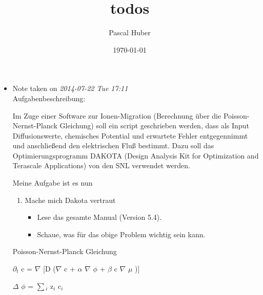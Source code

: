 \documentclass[11pt]{article}
\title{todos}
\author{Pascal Huber}
\date{\today}
\begin{document}
\maketitle

\setcounter{tocdepth}{3}
\tableofcontents
\vspace*{1cm}
\begin{itemize}
\item Note taken on \textit{2014-07-22 Tue 17:11} \\
Aufgabenbeschreibung:

     Im Zuge einer Software zur Ionen-Migration (Berechnung über die Poisson-Nernst-Planck Gleichung) soll ein script geschrieben werden, dass als Input Diffusionswerte, chemisches Potential und erwartete Fehler entgegennimmt und anschließend den elektrischen Fluß bestimmt.
     Dazu soll das Optimierungsprogramm DAKOTA (Design Analysis Kit for Optimization and Terascale Applications) von den SNL verwendet werden.

     Meine Aufgabe ist es nun
\begin{enumerate}
\item Mache mich Dakota vertraut
\begin{itemize}
\item Lese das gesamte Manual (Version 5.4).
\item Schaue, was für das obige Problem wichtig sein kann.
\end{itemize}
\end{enumerate}
Poisson-Nernst-Planck Gleichung

     $\partial$$_t$ c = $\nabla$ [D ($\nabla$ c + $\alpha$ $\nabla$ $\phi$ + $\beta$ c $\nabla$ $\mu$ )]

     $\Delta$ $\phi$ = $\sum$$_i$ z$_i$ c$_i$
\end{itemize}
\end{document}
